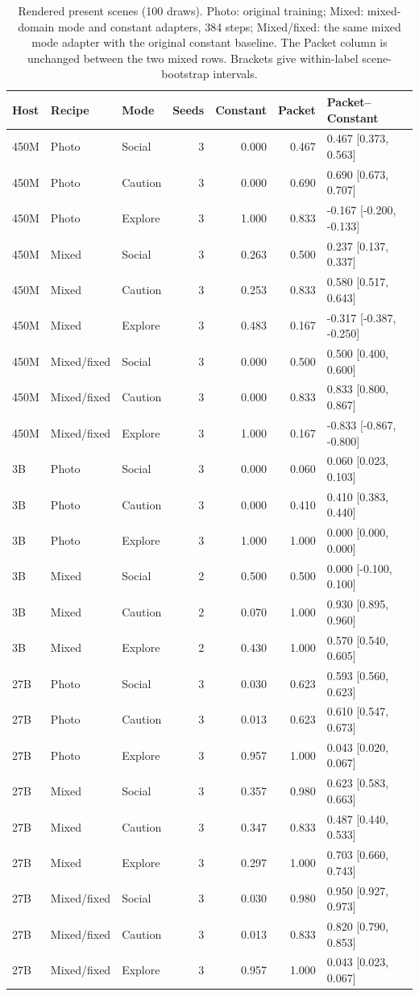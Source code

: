 \documentclass[10pt]{article}
\begin{document}
\begin{table}[htbp]\centering\small
\caption{Rendered present scenes (100 draws). Photo: original training;
Mixed: mixed-domain mode and constant adapters, 384 steps;
Mixed/fixed: the same mixed mode adapter with the original constant
baseline. The Packet column is unchanged between the two mixed rows.
Brackets give within-label scene-bootstrap intervals.}\label{tab:transfer}
\begin{tabular}{lllrrrl}\toprule
Host & Recipe & Mode & Seeds & Constant & Packet & Packet--Constant\\\midrule
450M & Photo & Social & 3 & 0.000 & 0.467 & 0.467 [0.373, 0.563] \\
450M & Photo & Caution & 3 & 0.000 & 0.690 & 0.690 [0.673, 0.707] \\
450M & Photo & Explore & 3 & 1.000 & 0.833 & -0.167 [-0.200, -0.133] \\
450M & Mixed & Social & 3 & 0.263 & 0.500 & 0.237 [0.137, 0.337] \\
450M & Mixed & Caution & 3 & 0.253 & 0.833 & 0.580 [0.517, 0.643] \\
450M & Mixed & Explore & 3 & 0.483 & 0.167 & -0.317 [-0.387, -0.250] \\
450M & Mixed/fixed & Social & 3 & 0.000 & 0.500 & 0.500 [0.400, 0.600] \\
450M & Mixed/fixed & Caution & 3 & 0.000 & 0.833 & 0.833 [0.800, 0.867] \\
450M & Mixed/fixed & Explore & 3 & 1.000 & 0.167 & -0.833 [-0.867, -0.800] \\
3B & Photo & Social & 3 & 0.000 & 0.060 & 0.060 [0.023, 0.103] \\
3B & Photo & Caution & 3 & 0.000 & 0.410 & 0.410 [0.383, 0.440] \\
3B & Photo & Explore & 3 & 1.000 & 1.000 & 0.000 [0.000, 0.000] \\
3B & Mixed & Social & 2 & 0.500 & 0.500 & 0.000 [-0.100, 0.100] \\
3B & Mixed & Caution & 2 & 0.070 & 1.000 & 0.930 [0.895, 0.960] \\
3B & Mixed & Explore & 2 & 0.430 & 1.000 & 0.570 [0.540, 0.605] \\
27B & Photo & Social & 3 & 0.030 & 0.623 & 0.593 [0.560, 0.623] \\
27B & Photo & Caution & 3 & 0.013 & 0.623 & 0.610 [0.547, 0.673] \\
27B & Photo & Explore & 3 & 0.957 & 1.000 & 0.043 [0.020, 0.067] \\
27B & Mixed & Social & 3 & 0.357 & 0.980 & 0.623 [0.583, 0.663] \\
27B & Mixed & Caution & 3 & 0.347 & 0.833 & 0.487 [0.440, 0.533] \\
27B & Mixed & Explore & 3 & 0.297 & 1.000 & 0.703 [0.660, 0.743] \\
27B & Mixed/fixed & Social & 3 & 0.030 & 0.980 & 0.950 [0.927, 0.973] \\
27B & Mixed/fixed & Caution & 3 & 0.013 & 0.833 & 0.820 [0.790, 0.853] \\
27B & Mixed/fixed & Explore & 3 & 0.957 & 1.000 & 0.043 [0.023, 0.067] \\


\end{tabular}
\end{table}
\end{document}
